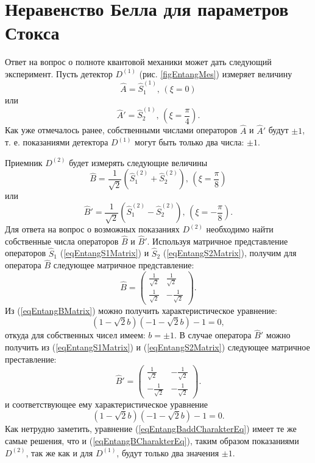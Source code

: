 \section{Неравенство Белла для параметров Стокса}
\label{pPart3EntangleBell}
Ответ на вопрос о полноте квантовой механики может дать следующий эксперимент.
Пусть детектор $D^{(1)}$ (рис. \ref{figEntangMes}) измеряет величину 
\[
\hat{A} = \hat{S}_1^{(1)}, \, (\xi = 0)
\] 
или
\[
\hat{A}' = \hat{S}_2^{(1)},\,(\xi =\frac{\pi}{4}).
\]
Как уже отмечалось ранее, собственными числами операторов $\hat{A}$ и
$\hat{A}'$ будут $\pm 1$, т. е. показаниями детектора $D^{(1)}$ могут
быть только два числа: $\pm 1$.

Приемник $D^{(2)}$ будет измерять следующие величины 
\[
\hat{B} = \frac{1}{\sqrt{2}}\left(\hat{S}_1^{(2)} + \hat{S}_2^{(2)}\right),\,(\xi =
\frac{\pi}{8}) 
\]
или 
\[
\hat{B}' = \frac{1}{\sqrt{2}}\left(\hat{S}_1^{(2)} - \hat{S}_2^{(2)}\right),\,(\xi =
- \frac{\pi}{8}).
\]
Для ответа на вопрос о возможных показаниях $D^{(2)}$ необходимо найти
собственные числа операторов $\hat{B}$ и $\hat{B}'$. Используя
матричное представление операторов $\hat{S}_1$
(\ref{eqEntangS1Matrix}) и $\hat{S}_2$ (\ref{eqEntangS2Matrix}),
получим для оператора $\hat{B}$ следующее матричное представление:
\begin{equation}
\hat{B} = 
\left(
\begin{array}{cc}
\frac{1}{\sqrt{2}} & \frac{1}{\sqrt{2}} \\
\frac{1}{\sqrt{2}} & -\frac{1}{\sqrt{2}} 
\end{array}
\right).
\label{eqEntangBMatrix}
\end{equation}
Из (\ref{eqEntangBMatrix}) можно получить характеристическое
уравнение:
\begin{equation}
\left(1 -\sqrt{2} b\right)\left(- 1 -\sqrt{2} b\right) -1 = 0,
\label{eqEntangBCharakterEq}
\end{equation}
откуда для собственных чисел имеем: $b = \pm 1$. В случае оператора
$\hat{B}'$  можно получить из (\ref{eqEntangS1Matrix}) и
(\ref{eqEntangS2Matrix}) следующее матричное преставление:
\begin{equation}
\hat{B}' = 
\left(
\begin{array}{cc}
\frac{1}{\sqrt{2}} & -\frac{1}{\sqrt{2}} \\
-\frac{1}{\sqrt{2}} & -\frac{1}{\sqrt{2}} 
\end{array}
\right).
\label{eqEntangBaddMatrix}
\end{equation}
и соответствующее ему характеристическое уравнение
\begin{equation}
\left(1 -\sqrt{2} b\right)\left(- 1 -\sqrt{2} b\right) -1 = 0.
\label{eqEntangBaddCharakterEq}
\end{equation}
Как нетрудно заметить, уравнение (\ref{eqEntangBaddCharakterEq}) имеет
те же самые решения, что и (\ref{eqEntangBCharakterEq}), таким образом
показаниями $D^{(2)}$, так же как и для $D^{(1)}$, будут только два
значения $\pm 1$.

